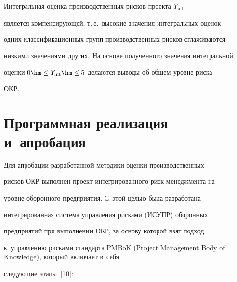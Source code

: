 

     


     Интегральная оценка производственных рисков проекта $Y_{\mathrm{int}}$ 


является компенсирующей, т.\,е.\ высокие значения интегральных оценок 


одних классификационных групп производственных рисков сглаживаются 


низкими значениями других. На основе полученного значения интегральной 


оценки $0\hm\leq Y_{\mathrm{int}}\hm\leq 5$ делаются выводы об общем уровне риска 


ОКР. 







     


\section{Программная реализация и~апробация}










      Для апробации разработанной методики оценки производственных 


рисков ОКР выполнен проект интегрированного риск-менеджмента на 


уровне оборонного предприятия. С~этой целью была разработана 


интегрированная система управления рисками (ИСУПР) оборонных 


предприятий при выполнении ОКР, за основу которой взят подход 


к~управлению рисками стандарта PMBoK (Project Management Body of Knowledge), который включает в~себя 


следующие этапы~[10]:


